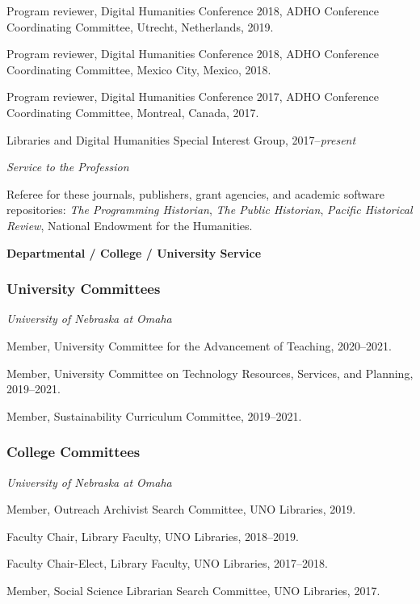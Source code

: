 Program reviewer, Digital Humanities Conference 2018, ADHO Conference
Coordinating Committee, Utrecht, Netherlands, 2019.

Program reviewer, Digital Humanities Conference 2018, ADHO Conference
Coordinating Committee, Mexico City, Mexico, 2018.

Program reviewer, Digital Humanities Conference 2017, ADHO Conference
Coordinating Committee, Montreal, Canada, 2017.

Libraries and Digital Humanities Special Interest Group,
2017--\emph{present}

\vspace{.4cm}

\emph{Service to the Profession}

Referee for these journals, publishers, grant agencies, and academic
software repositories: \emph{The Programming Historian}, \emph{The
Public Historian}, \emph{Pacific Historical Review}, National Endowment
for the Humanities.

\vspace{.4cm}

\textbf{Departmental / College / University Service}

\subsubsection{University Committees}\label{university-committees}

\emph{University of Nebraska at Omaha}

Member, University Committee for the Advancement of Teaching,
2020--2021.

Member, University Committee on Technology Resources, Services, and
Planning, 2019--2021.

Member, Sustainability Curriculum Committee, 2019--2021.

\subsubsection{College Committees}\label{college-committees}

\emph{University of Nebraska at Omaha}

Member, Outreach Archivist Search Committee, UNO Libraries, 2019.

Faculty Chair, Library Faculty, UNO Libraries, 2018--2019.

Faculty Chair-Elect, Library Faculty, UNO Libraries, 2017--2018.

Member, Social Science Librarian Search Committee, UNO Libraries, 2017.

